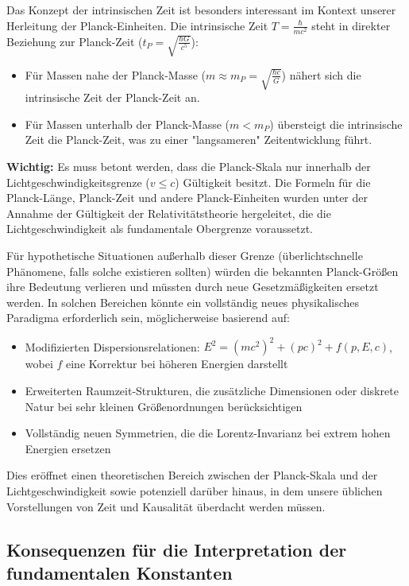 \documentclass{article}
\begin{document}
	Das Konzept der intrinsischen Zeit ist besonders interessant im Kontext unserer Herleitung der Planck-Einheiten. Die intrinsische Zeit $T = \frac{\hbar}{mc^2}$ steht in direkter Beziehung zur Planck-Zeit ($t_P = \sqrt{\frac{\hbar G}{c^5}}$):
	
	\begin{itemize}
		\item Für Massen nahe der Planck-Masse ($m \approx m_P = \sqrt{\frac{\hbar c}{G}}$) nähert sich die intrinsische Zeit der Planck-Zeit an.
		\item Für Massen unterhalb der Planck-Masse ($m < m_P$) übersteigt die intrinsische Zeit die Planck-Zeit, was zu einer "langsameren" Zeitentwicklung führt.
	\end{itemize}
	
	\textbf{Wichtig:} Es muss betont werden, dass die Planck-Skala nur innerhalb der Lichtgeschwindigkeitsgrenze ($v \leq c$) Gültigkeit besitzt. Die Formeln für die Planck-Länge, Planck-Zeit und andere Planck-Einheiten wurden unter der Annahme der Gültigkeit der Relativitätstheorie hergeleitet, die die Lichtgeschwindigkeit als fundamentale Obergrenze voraussetzt.
	
	Für hypothetische Situationen außerhalb dieser Grenze (überlichtschnelle Phänomene, falls solche existieren sollten) würden die bekannten Planck-Größen ihre Bedeutung verlieren und müssten durch neue Gesetzmäßigkeiten ersetzt werden. In solchen Bereichen könnte ein vollständig neues physikalisches Paradigma erforderlich sein, möglicherweise basierend auf:
	
	\begin{itemize}
		\item Modifizierten Dispersionsrelationen: $E^2 = (mc^2)^2 + (pc)^2 + f(p,E,c)$, wobei $f$ eine Korrektur bei höheren Energien darstellt
		\item Erweiterten Raumzeit-Strukturen, die zusätzliche Dimensionen oder diskrete Natur bei sehr kleinen Größenordnungen berücksichtigen
		\item Vollständig neuen Symmetrien, die die Lorentz-Invarianz bei extrem hohen Energien ersetzen
	\end{itemize}
	
	Dies eröffnet einen theoretischen Bereich zwischen der Planck-Skala und der Lichtgeschwindigkeit sowie potenziell darüber hinaus, in dem unsere üblichen Vorstellungen von Zeit und Kausalität überdacht werden müssen.
	
	\subsection{Konsequenzen für die Interpretation der fundamentalen Konstanten}
	
\end{document}
